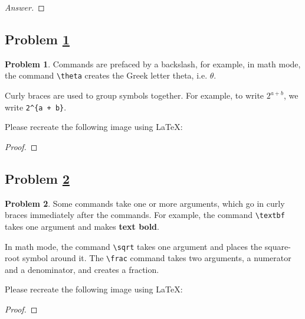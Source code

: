 \documentclass[11pt]{article}
\theoremstyle{definition}
\theoremstyle{definition}
\newtheorem{required}{Problem}
\theoremstyle{definition}
\begin{document}
\begin{proof}[Answer]
\end{proof}



\newpage
\subsection{Problem \ref{Latex2}} 
\begin{required} \label{Latex2}
Commands are prefaced by a backslash, for example, in math mode, the command \texttt{\textbackslash theta} creates the Greek letter theta, i.e. $\theta$.

Curly braces are used to group symbols together. For example, to write $2^{a + b}$, we write \texttt{2\^{}\{a + b\}}.

Please recreate the following image using \LaTeX:

\end{required}

\begin{proof}
\end{proof}



\newpage
\subsection{Problem \ref{Latex3}}
\begin{required} \label{Latex3}
Some commands take one or more arguments, which go in curly braces immediately after the commands. For example, the command \texttt{\textbackslash textbf} takes one argument and makes \textbf{text bold}.

In math mode, the command \texttt{\textbackslash sqrt} takes one argument and places the square-root symbol around it. The \texttt{\textbackslash frac} command takes two arguments, a numerator and a denominator, and creates a fraction.

Please recreate the following image using \LaTeX:

\end{required}

\begin{proof}
\end{proof}
\end{document}
